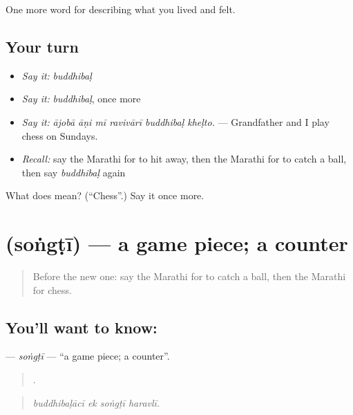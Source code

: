 \begin{grammarlens}[title={What you've built}]
One more word for describing what you lived and felt.
\end{grammarlens}

\subsection*{Your turn}
\begin{itemize}
\raggedright
  \item \emph{Say it:} \emph{buddhibaḷ}
  \item \emph{Say it:} \emph{buddhibaḷ}, once more
  \item \emph{Say it:} \emph{ājobā āṇi mī ravivārī buddhibaḷ kheḷto.} — Grandfather and I play chess on Sundays.
  \item \emph{Recall:} say the Marathi for to hit away, then the Marathi for to catch a ball, then say \emph{buddhibaḷ} again
\end{itemize}

\begin{tcolorbox}[breakable,colback=teal!4,colframe=teal!35!black,title={Before you move on}]
What does  mean? (\textquotedblleft{}Chess\textquotedblright{}.) Say it once more.
\end{tcolorbox}
\section[\texorpdfstring{\mr{सोंगटी} (soṅgṭī)}{सोंगटी (soṅgṭī)}]{ (soṅgṭī) — a game piece; a counter}

\label{lesson:MR-C532-songti}



\begin{quote}
Before the new one: say the Marathi for to catch a ball, then the Marathi for chess.
\end{quote}

\subsection*{You'll want to know: }
\textbf{} — \emph{soṅgṭī} — \textquotedblleft{}a game piece; a counter\textquotedblright{}.

\begin{quote}
   .
\end{quote}

\begin{quote}
\emph{buddhibaḷācī ek soṅgṭī haravlī.}
\end{quote}

